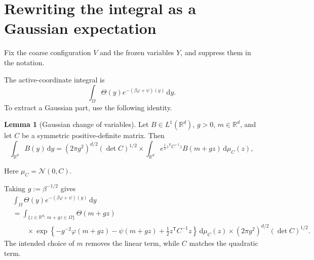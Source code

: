 \documentclass[10pt,reqno]{amsart}
\theoremstyle{definition}
\newtheorem{lemma}[definition]{Lemma}
\theoremstyle{remark}
\numberwithin{equation}{section}
\numberwithin{figure}{section}
\newcommand{\dd}{\mathrm d}
\newcommand{\R}{\mathbb R}
\begin{document}
\section{Rewriting the integral as a Gaussian expectation}
Fix the coarse configuration $V$ and the frozen variables $Y$, and suppress them in the notation.

The active-coordinate integral is
\begin{equation}\label{eq:display-099}
\int_{\Omega}\Theta(y)e^{-(\beta\varphi+\psi)(y)}\,\dd y.
\end{equation}
To extract a Gaussian part, use the following identity.

\begin{lemma}[Gaussian change of variables]\label{lem:gaussian-change}
Let $B\in L^1(\R^d)$, $g>0$, $m\in\R^d$, and let $C$ be a symmetric positive-definite matrix. Then
\begin{equation}\label{eq:gaussian-identity}
\int_{\R^d}B(y)\,\dd y
=(2\pi g^2)^{d/2}(\det C)^{1/2} \times\int_{\R^d}
 e^{\frac12z^{\mathsf T}C^{-1}z}B(m+gz)\,\dd\mu_C(z),
\end{equation}

Here $\mu_C=\mathcal N(0,C)$.

\end{lemma}

Taking $g:=\beta^{-1/2}$ gives
\begin{equation}\label{eq:display-101}
\begin{aligned}
&\int_{\Omega}\Theta(y)e^{-(\beta\varphi+\psi)(y)}\,\dd y\\
&=\int_{\{z\in\R^d:\,m+gz\in\Omega\}}\Theta(m+gz)\\
&\qquad\times\exp\left\{-g^{-2}\varphi(m+gz)-\psi(m+gz)
+\frac12z^{\mathsf T}C^{-1}z\right\}\,\dd\mu_C(z)
\times(2\pi g^2)^{d/2}(\det C)^{1/2}.
\end{aligned}
\end{equation}
The intended choice of $m$ removes the linear term, while $C$ matches the quadratic term.
\end{document}

